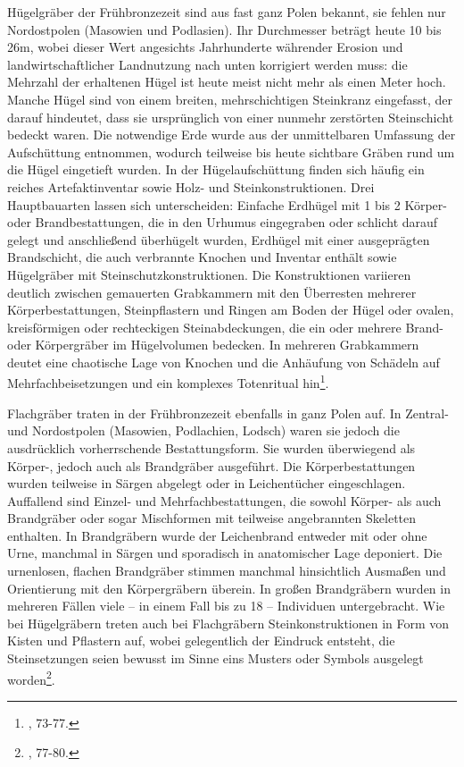 \documentclass[openany,twoside,twocolumn]{book}
\let\rmarkdownfootnote\footnote%
\def\footnote{\protect\rmarkdownfootnote}
\begin{document}
Hügelgräber der Frühbronzezeit sind aus fast ganz Polen bekannt, sie
fehlen nur Nordostpolen (Masowien und Podlasien). Ihr Durchmesser
beträgt heute 10 bis 26m, wobei dieser Wert angesichts Jahrhunderte
währender Erosion und landwirtschaftlicher Landnutzung nach unten
korrigiert werden muss: die Mehrzahl der erhaltenen Hügel ist heute
meist nicht mehr als einen Meter hoch. Manche Hügel sind von einem
breiten, mehrschichtigen Steinkranz eingefasst, der darauf hindeutet,
dass sie ursprünglich von einer nunmehr zerstörten Steinschicht bedeckt
waren. Die notwendige Erde wurde aus der unmittelbaren Umfassung der
Aufschüttung entnommen, wodurch teilweise bis heute sichtbare Gräben
rund um die Hügel eingetieft wurden. In der Hügelaufschüttung finden
sich häufig ein reiches Artefaktinventar sowie Holz- und
Steinkonstruktionen. Drei Hauptbauarten lassen sich unterscheiden:
Einfache Erdhügel mit 1 bis 2 Körper- oder Brandbestattungen, die in den
Urhumus eingegraben oder schlicht darauf gelegt und anschließend
überhügelt wurden, Erdhügel mit einer ausgeprägten Brandschicht, die
auch verbrannte Knochen und Inventar enthält sowie Hügelgräber mit
Steinschutzkonstruktionen. Die Konstruktionen variieren deutlich
zwischen gemauerten Grabkammern mit den Überresten mehrerer
Körperbestattungen, Steinpflastern und Ringen am Boden der Hügel oder
ovalen, kreisförmigen oder rechteckigen Steinabdeckungen, die ein oder
mehrere Brand- oder Körpergräber im Hügelvolumen bedecken. In mehreren
Grabkammern deutet eine chaotische Lage von Knochen und die Anhäufung
von Schädeln auf Mehrfachbeisetzungen und ein komplexes Totenritual
hin\footnote{\textcite{dabrowski_aeltere_2004}, 73-77.}.

Flachgräber traten in der Frühbronzezeit ebenfalls in ganz Polen auf. In
Zentral- und Nordostpolen (Masowien, Podlachien, Lodsch) waren sie
jedoch die ausdrücklich vorherrschende Bestattungsform. Sie wurden
überwiegend als Körper-, jedoch auch als Brandgräber ausgeführt. Die
Körperbestattungen wurden teilweise in Särgen abgelegt oder in
Leichentücher eingeschlagen. Auffallend sind Einzel- und
Mehrfachbestattungen, die sowohl Körper- als auch Brandgräber oder sogar
Mischformen mit teilweise angebrannten Skeletten enthalten. In
Brandgräbern wurde der Leichenbrand entweder mit oder ohne Urne,
manchmal in Särgen und sporadisch in anatomischer Lage deponiert. Die
urnenlosen, flachen Brandgräber stimmen manchmal hinsichtlich Ausmaßen
und Orientierung mit den Körpergräbern überein. In großen Brandgräbern
wurden in mehreren Fällen viele -- in einem Fall bis zu 18 -- Individuen
untergebracht. Wie bei Hügelgräbern treten auch bei Flachgräbern
Steinkonstruktionen in Form von Kisten und Pflastern auf, wobei
gelegentlich der Eindruck entsteht, die Steinsetzungen seien bewusst im
Sinne eins Musters oder Symbols ausgelegt worden\footnote{\textcite{dabrowski_aeltere_2004},
  77-80.}.
\end{document}

